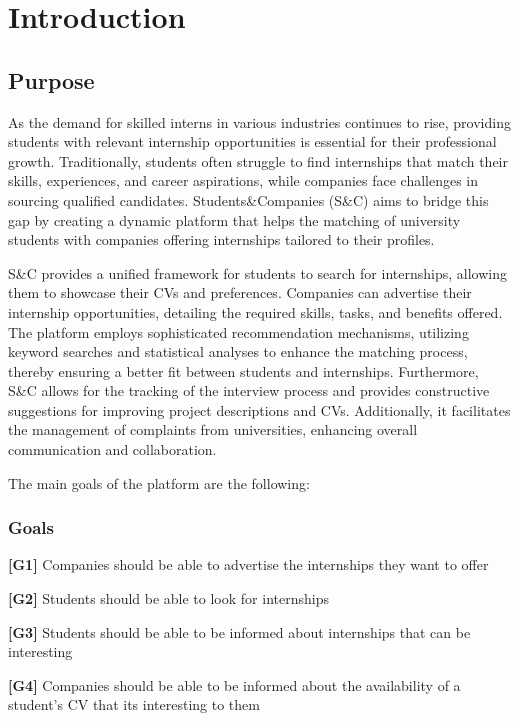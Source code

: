 \chapter{Introduction}

\section{Purpose}
As the demand for skilled interns in various industries continues to rise, providing students with relevant internship opportunities is essential for their professional growth. 
Traditionally, students often struggle to find internships that match their skills, experiences, and career aspirations, while companies face challenges in sourcing qualified candidates. 
Students\&Companies (S\&C) aims to bridge this gap by creating a dynamic platform that helps the matching of university students with companies offering internships tailored to their profiles.

S\&C provides a unified framework for students to search for internships, allowing them to showcase their CVs and preferences. 
Companies can advertise their internship opportunities, detailing the required skills, tasks, and benefits offered.
The platform employs sophisticated recommendation mechanisms, utilizing keyword searches and statistical analyses to enhance the matching process, thereby ensuring a better fit between students and internships.
Furthermore, S\&C allows for the tracking of the interview process and provides constructive suggestions for improving project descriptions and CVs. Additionally, it facilitates the management of complaints from universities, enhancing overall communication and collaboration. 

The main goals of the platform are the following:

\subsection{Goals}

\textbf{[G1]} Companies should be able to advertise the internships they want to offer 

\textbf{[G2]} Students should be able to look for internships 

\textbf{[G3]} Students should be able to be informed about internships that can be interesting  

\textbf{[G4]} Companies should be able to be informed about the availability of a student's CV that its interesting to them

